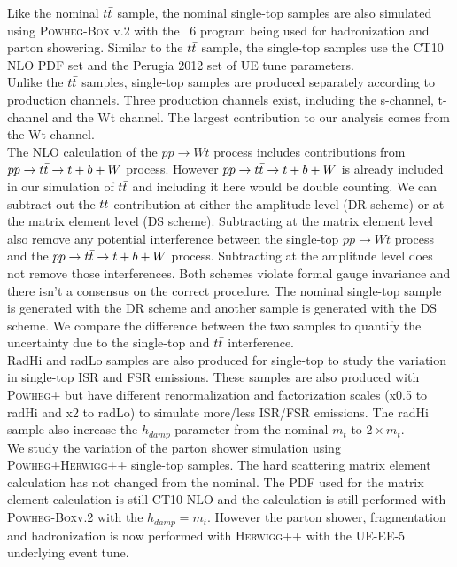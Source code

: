 \indent Like the nominal $t\bar{t}$ sample, the nominal single-top samples are also simulated using \textsc{Powheg-Box} v.2\cite{PowhegST_st,PowhegST_wt} with the \pythia~6 program being used for hadronization and parton showering.  Similar to the $t\bar{t}$ sample, the single-top samples use the CT10 NLO PDF set and the Perugia 2012 set of UE tune parameters. \\

\indent Unlike the $t\bar{t}$ samples, single-top samples are produced separately according to production channels.  Three production channels exist, including the s-channel, t-channel and the Wt channel.  The largest contribution to our analysis comes from the Wt channel.  \\

\indent The NLO calculation of the $pp \rightarrow Wt$ process includes contributions from $ pp \rightarrow t\bar{t} \rightarrow t + b + W$ process.  However $ pp \rightarrow t\bar{t} \rightarrow t + b + W$ is already included in our simulation of $t\bar{t}$ and including it here would be double counting.  We can subtract out the $t\bar{t}$ contribution at either the amplitude level (DR scheme) or at the matrix element level (DS scheme).  Subtracting at the matrix element level also remove any potential interference between the single-top $pp \rightarrow Wt$ process and the $ pp \rightarrow t\bar{t} \rightarrow t + b + W$ process.  Subtracting at the amplitude level does not remove those interferences.  Both schemes violate formal gauge invariance and there isn't a consensus on the correct procedure.  The nominal single-top sample is generated with the DR scheme and another sample is generated with the DS scheme.  We compare the difference between the two samples to quantify the uncertainty due to the single-top and $t\bar{t}$ interference. \\

\indent RadHi and radLo samples are also produced for single-top to study the variation in single-top ISR and FSR emissions.  These samples are also produced with \textsc{Powheg+} but have different renormalization and factorization scales (x0.5 to radHi and x2 to radLo) to simulate more/less ISR/FSR emissions. The radHi sample also increase the $h_{damp}$ parameter from the nominal $m_{t}$ to $2 \times m_{t}$. \\

\indent We study the variation of the parton shower simulation using \textsc{Powheg+Herwigg++} single-top samples.  The hard scattering matrix element calculation has not changed from the nominal.  The PDF used for the matrix element calculation is still CT10 NLO and the calculation is still performed with \textsc{Powheg-Box}v.2 with the $h_{damp} = m_{t}$.  However the parton shower, fragmentation and hadronization is now performed with \textsc{Herwigg++} with the UE-EE-5 underlying event tune.\cite{CTEQ6L1} \\

